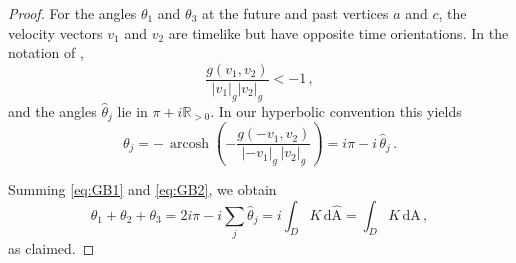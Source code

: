\documentclass[11pt,reqno]{amsart}
\theoremstyle{definition}
\theoremstyle{definition}
\theoremstyle{plain}
\theoremstyle{remark}
\DeclareMathOperator{\arccosh}{arcosh}
\begin{document}
\begin{proof}
    For the angles $\theta_1$ and $\theta_3$ at the future and past vertices $a$ and $c$, the velocity vectors $v_1$ and $v_2$ are timelike but have opposite time orientations.  
    In the notation of \cite{jee1984}, 
    \[
        \frac{g(v_1,v_2)}{|v_1|_g |v_2|_g} < -1 \, ,
    \]
    and the angles $\hat{\theta}_j$ lie in $\pi + i\mathbb{R}_{>0}$.  
    In our hyperbolic convention this yields
    \begin{equation}\label{eq:GB2}
        \theta_j
        = -\,\arccosh\!\left( -\frac{g(-v_1,v_2)}{|-v_1|_g\, |v_2|_g} \right)
        = i\pi - i\, \hat{\theta}_j \, .
    \end{equation}

    Summing \eqref{eq:GB1} and \eqref{eq:GB2}, we obtain
    \begin{equation*}
        \theta_1 + \theta_2 + \theta_3
        = 2i\pi - i \sum_j \hat{\theta}_j
        = i \int_D {K}\, \mathrm{d}\hat{\mathrm{A}}
        = \int_D K \, \mathrm{dA} \, ,
    \end{equation*}
    as claimed.
\end{proof}
\end{document}
